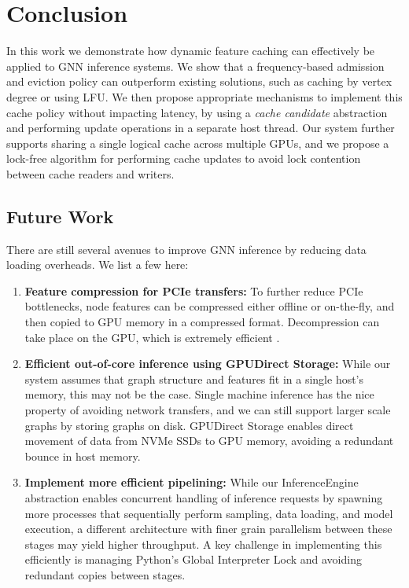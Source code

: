 \chapter{Conclusion}
In this work we demonstrate how dynamic feature caching can effectively be applied to GNN inference systems. We show that a frequency-based admission and eviction policy can outperform existing solutions, such as caching by vertex degree or using LFU. We then propose appropriate mechanisms to implement this cache policy without impacting latency, by using a \textit{cache candidate} abstraction and performing update operations in a separate host thread.
Our system further supports sharing a single logical cache across multiple GPUs, and we propose a lock-free algorithm for performing cache updates to avoid lock contention between cache readers and writers.

\section{Future Work}
There are still several avenues to improve GNN inference by reducing data loading overheads. We list a few here:
\begin{enumerate}
    \item \textbf{Feature compression for PCIe transfers:} To further reduce PCIe bottlenecks, node features can be compressed either offline or on-the-fly, and then copied to GPU memory in a compressed format. Decompression can take place on the GPU, which is extremely efficient \cite{NVComp}.
    \item \textbf{Efficient out-of-core inference using GPUDirect Storage:} While our system assumes that graph structure and features fit in a single host's memory, this may not be the case. Single machine inference has the nice property of avoiding network transfers, and we can still support larger scale graphs by storing graphs on disk. GPUDirect Storage \cite{GDS} enables direct movement of data from NVMe SSDs to GPU memory, avoiding a redundant bounce in host memory.
    \item \textbf{Implement more efficient pipelining:} While our InferenceEngine abstraction enables concurrent handling of inference requests by spawning more processes that sequentially perform sampling, data loading, and model execution, a different architecture with finer grain parallelism between these stages may yield higher throughput. A key challenge in implementing this efficiently is managing Python's Global Interpreter Lock and avoiding redundant copies between stages.
\end{enumerate}
